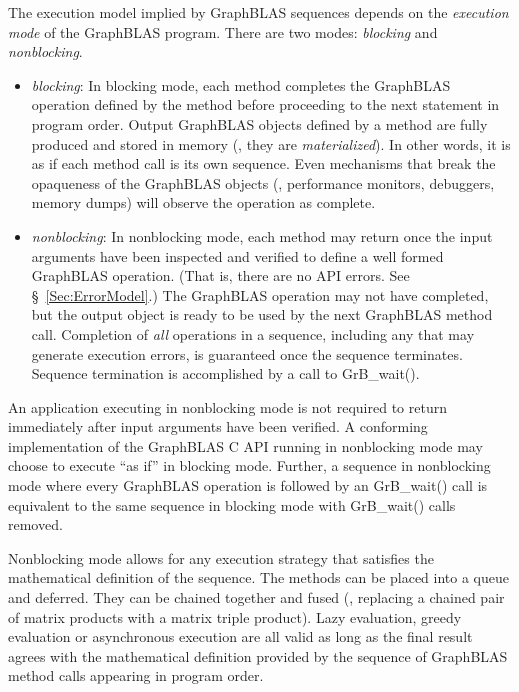 The execution model
implied by GraphBLAS sequences depends on the \emph{execution mode} of the 
GraphBLAS program.  There are two modes: \emph{blocking} and \emph{nonblocking}.  
\begin{itemize}

\item \emph{blocking}: In blocking mode, each method completes the
GraphBLAS operation defined by the method before proceeding to the
next statement in program order.  Output GraphBLAS objects defined by a
method are fully produced and stored in  memory (\ie, they are
\emph{materialized}).  In other words, it is as if each method call is its own sequence.
Even mechanisms that break the opaqueness of the
GraphBLAS objects (\eg, performance monitors, debuggers, memory dumps)
will observe the operation as complete.

\item \emph{nonblocking}: In nonblocking mode, each method may return
once the input arguments have been inspected and verified to define a
well formed GraphBLAS operation. (That is, there are no API errors. See
\S~\ref{Sec:ErrorModel}.) The GraphBLAS operation may not have completed,
but the output object is ready to be used by the next GraphBLAS method
call.  Completion of \emph{all} operations in a sequence, including any that may generate execution
errors, is guaranteed once the sequence terminates.  Sequence termination is
accomplished by a call to  {\sf GrB\_wait()}.

\end{itemize}

An application executing in nonblocking mode is not required to return
immediately after input arguments have been verified. A conforming
implementation of the GraphBLAS C API running in nonblocking mode may
choose to execute ``as if'' in blocking mode.  Further, a sequence in
nonblocking mode where every GraphBLAS operation is followed by an {\sf
GrB\_wait()} call is equivalent to the same sequence in blocking mode
with {\sf GrB\_wait()} calls removed.

Nonblocking mode allows for any execution strategy that satisfies the
mathematical definition of the sequence.  The methods can be placed
into a queue and deferred.  They can be chained together and fused
(\eg, replacing a chained pair of matrix products with a matrix triple
product).  Lazy evaluation, greedy evaluation or asynchronous execution
are all valid as long as the final result agrees with the mathematical
definition provided by the sequence of GraphBLAS method calls appearing
in  program order.


